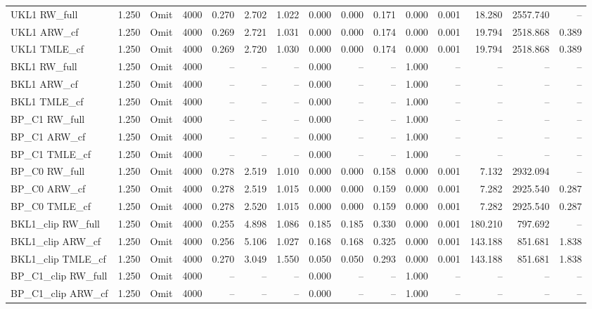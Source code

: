 \begin{tabular}{llllrrrrrrrrrrr}
UKL1 RW\_full & 1.250 & Omit & 4000 & 0.270 & 2.702 & 1.022 & 0.000 & 0.000 & 0.171 & 0.000 & 0.001 & 18.280 & 2557.740 & -- \\
UKL1 ARW\_cf & 1.250 & Omit & 4000 & 0.269 & 2.721 & 1.031 & 0.000 & 0.000 & 0.174 & 0.000 & 0.001 & 19.794 & 2518.868 & 0.389 \\
UKL1 TMLE\_cf & 1.250 & Omit & 4000 & 0.269 & 2.720 & 1.030 & 0.000 & 0.000 & 0.174 & 0.000 & 0.001 & 19.794 & 2518.868 & 0.389 \\
BKL1 RW\_full & 1.250 & Omit & 4000 & -- & -- & -- & 0.000 & -- & -- & 1.000 & -- & -- & -- & -- \\
BKL1 ARW\_cf & 1.250 & Omit & 4000 & -- & -- & -- & 0.000 & -- & -- & 1.000 & -- & -- & -- & -- \\
BKL1 TMLE\_cf & 1.250 & Omit & 4000 & -- & -- & -- & 0.000 & -- & -- & 1.000 & -- & -- & -- & -- \\
BP\_C1 RW\_full & 1.250 & Omit & 4000 & -- & -- & -- & 0.000 & -- & -- & 1.000 & -- & -- & -- & -- \\
BP\_C1 ARW\_cf & 1.250 & Omit & 4000 & -- & -- & -- & 0.000 & -- & -- & 1.000 & -- & -- & -- & -- \\
BP\_C1 TMLE\_cf & 1.250 & Omit & 4000 & -- & -- & -- & 0.000 & -- & -- & 1.000 & -- & -- & -- & -- \\
BP\_C0 RW\_full & 1.250 & Omit & 4000 & 0.278 & 2.519 & 1.010 & 0.000 & 0.000 & 0.158 & 0.000 & 0.001 & 7.132 & 2932.094 & -- \\
BP\_C0 ARW\_cf & 1.250 & Omit & 4000 & 0.278 & 2.519 & 1.015 & 0.000 & 0.000 & 0.159 & 0.000 & 0.001 & 7.282 & 2925.540 & 0.287 \\
BP\_C0 TMLE\_cf & 1.250 & Omit & 4000 & 0.278 & 2.520 & 1.015 & 0.000 & 0.000 & 0.159 & 0.000 & 0.001 & 7.282 & 2925.540 & 0.287 \\
BKL1\_clip RW\_full & 1.250 & Omit & 4000 & 0.255 & 4.898 & 1.086 & 0.185 & 0.185 & 0.330 & 0.000 & 0.001 & 180.210 & 797.692 & -- \\
BKL1\_clip ARW\_cf & 1.250 & Omit & 4000 & 0.256 & 5.106 & 1.027 & 0.168 & 0.168 & 0.325 & 0.000 & 0.001 & 143.188 & 851.681 & 1.838 \\
BKL1\_clip TMLE\_cf & 1.250 & Omit & 4000 & 0.270 & 3.049 & 1.550 & 0.050 & 0.050 & 0.293 & 0.000 & 0.001 & 143.188 & 851.681 & 1.838 \\
BP\_C1\_clip RW\_full & 1.250 & Omit & 4000 & -- & -- & -- & 0.000 & -- & -- & 1.000 & -- & -- & -- & -- \\
BP\_C1\_clip ARW\_cf & 1.250 & Omit & 4000 & -- & -- & -- & 0.000 & -- & -- & 1.000 & -- & -- & -- & -- \\

\end{tabular}
